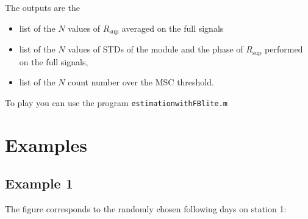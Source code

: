 \documentclass[a4paper, 12pt]{report}
\begin{document}
The outputs are the 
\begin{itemize}
\item
list of the $N$ values of  $R_{\sup}$ averaged on the full signals
\item
list of the $N$ values of  STDs of the module and the phase of $R_{\sup}$ performed on the full signals,
\item
list of the $N$ count number over the MSC threshold.                                                                                                                                                                                                                                                                                                                                                                                                                                                                                                                                                                                                                                                                                                                                                                                                                                                                                                                                                                                                                                                                                                                                                                                                                                                                                                                                                                                                                                                                                                                                                                                         
\end{itemize}

To play you can use the program { \tt estimationwithFBlite.m}


 \newpage
\section{Examples}


\subsection{Example 1}
The figure corresponds to the randomly chosen following days on station 1:
\end{document}
